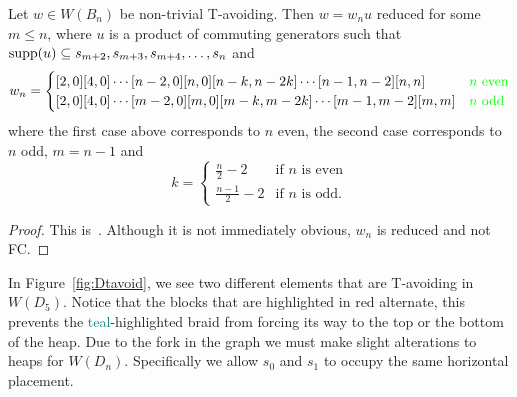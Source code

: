 \begin{proposition}
	Let $w \in W(B_n)$ be non-trivial T-avoiding. 
Then $w=w_nu$ reduced for some $m \leq n$, where $u$ is a product of commuting generators such that $\mathrm{supp}(u) \subseteq{s_{m+2}, s_{m+3}, s_{m+4}, \ldots, s_n}$ and 
\[ w_n=
\begin{cases}
	[2,0][4,0] \cdots [n-2,0][n,0][n-k,n-2k] \cdots [n-1,n-2][n,n]  &  \text{\textcolor{green}{ $n$ even}}\\
	[2,0][4,0] \cdots [m-2,0][m,0][m-k,m-2k] \cdots [m-1,m-2][m,m] &  \text{\textcolor{green}{$n$ odd}}
\end{cases}
\] where the first case above corresponds to $n$ even, the second case corresponds to $n$ odd, $m=n-1$ and 
\[
k= 
\begin{cases}
\frac{n}{2}-2 & \text{if $n$ is even}\\
\frac{n-1}{2}-2 & \text{if $n$ is odd.}
\end{cases}
\]
\begin{proof}
	This is~\cite[Lemmas 2.2.18 and 2.3.4]{Gern2013a}. Although it is not immediately obvious, $w_n$ is reduced and not FC.
\end{proof}
\end{proposition}

In Figure~\ref{fig:Dtavoid}, we see two different elements that are T-avoiding in $W(D_5)$. Notice that the blocks that are highlighted in \textcolor{rred}{red} alternate, this prevents the \textcolor{teal}{teal}-highlighted braid from forcing its way to the top or the bottom of the heap. Due to the fork in the graph we must make slight alterations to heaps for $W(D_n)$. Specifically we allow $s_0$ and $s_1$ to occupy the same horizontal placement. 

